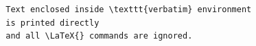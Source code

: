 \documentclass{article}
\begin{document}
	\begin{verbatim}
		Text enclosed inside \texttt{verbatim} environment 
		is printed directly 
		and all \LaTeX{} commands are ignored.
	\end{verbatim}
\end{document}
